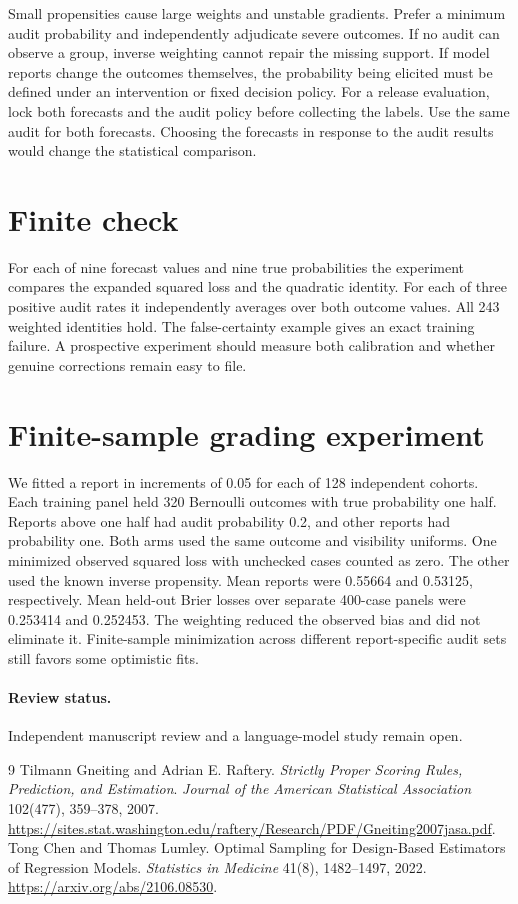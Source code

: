 \documentclass[11pt]{article}
\begin{document}
Small propensities cause large weights and unstable gradients.
Prefer a minimum audit probability and independently adjudicate
severe outcomes. If no audit can observe a group, inverse weighting
cannot repair the missing support. If model reports change the
outcomes themselves, the probability being elicited must be defined
under an intervention or fixed decision policy.
For a release evaluation, lock both forecasts and the audit
policy before collecting the labels. Use the same audit for
both forecasts. Choosing the forecasts in response to the
audit results would change the statistical comparison.

\newpage
\section{Finite check}
For each of nine forecast values and nine true probabilities
the experiment compares the expanded squared loss and the
quadratic identity. For each of three positive audit rates it
independently averages over both outcome values. All 243 weighted
identities hold. The false-certainty example gives an exact
training failure. A prospective experiment should measure both
calibration and whether genuine corrections remain easy to file.
\section{Finite-sample grading experiment}
We fitted a report in increments of 0.05 for each of 128
independent cohorts. Each training panel held 320 Bernoulli
outcomes with true probability one half. Reports above one half
had audit probability 0.2, and other reports had probability one.
Both arms used the same outcome and visibility uniforms. One
minimized observed squared loss with unchecked cases counted as
zero. The other used the known inverse propensity. Mean reports
were 0.55664 and 0.53125, respectively. Mean held-out Brier losses
over separate 400-case panels were 0.253414 and 0.252453.
The weighting reduced the observed bias and did not eliminate it.
Finite-sample minimization across different report-specific audit
sets still favors some optimistic fits.

\paragraph{Review status.} Independent manuscript review and a language-model study remain open.

\begin{thebibliography}{9}
 Tilmann Gneiting and Adrian E. Raftery.
\emph{Strictly Proper Scoring Rules, Prediction, and Estimation}.
\emph{Journal of the American Statistical Association} 102(477), 359--378, 2007.
\url{https://sites.stat.washington.edu/raftery/Research/PDF/Gneiting2007jasa.pdf}.
 Tong Chen and Thomas Lumley.
Optimal Sampling for Design-Based Estimators of Regression Models.
\emph{Statistics in Medicine} 41(8), 1482--1497, 2022.
\url{https://arxiv.org/abs/2106.08530}.
\end{thebibliography}
\end{document}
